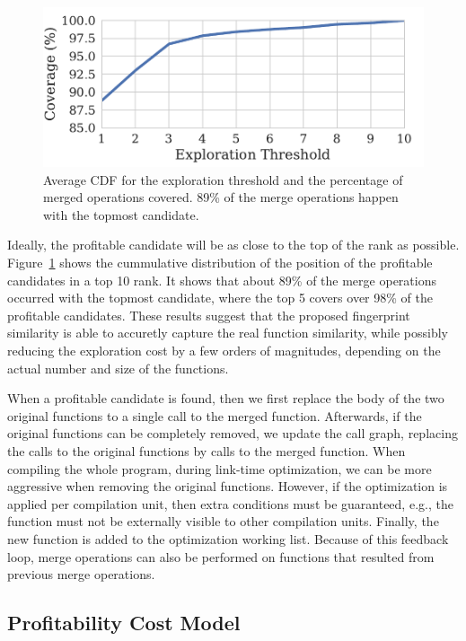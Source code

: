 \begin{figure}[h]
  \centering
  \includegraphics[width=0.8\linewidth]{figs/average-cdf-exploration-threshold.pdf}
  \caption{Average CDF for the exploration threshold and the percentage of merged operations covered.
           89\% of the merge operations happen with the topmost candidate.}
  \label{fig:average-cdf-exploration-threshold}
\end{figure}

Ideally, the profitable candidate will be as close to the top of the rank as
possible.
Figure~\ref{fig:average-cdf-exploration-threshold} shows the cummulative
distribution of the position of the profitable candidates in a top 10 rank.
It shows that about 89\% of the merge operations occurred with the topmost
candidate, where the top 5 covers over 98\% of the profitable candidates.
These results suggest that the proposed fingerprint similarity is able to
accuretly capture the real function similarity, while possibly reducing the
exploration cost by a few orders of magnitudes, depending on the actual number
and size of the functions.

When a profitable candidate is found, then we first replace the body of the two
original functions to a single call to the merged function.
Afterwards, if the original functions can be completely removed, we update the
call graph, replacing the calls to the original functions by calls to the
merged function.
When compiling the whole program, during link-time optimization, we can be more
aggressive when removing the original functions.
However, if the optimization is applied per compilation unit, then extra
conditions must be guaranteed, e.g., the function must not be externally visible
to other compilation units.
Finally, the new function is added to the optimization working list.
Because of this feedback loop, merge operations can also be performed on
functions that resulted from previous merge operations.

\subsection{Profitability Cost Model}\label{sec:profit-model}

